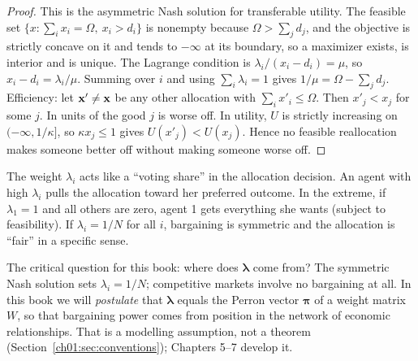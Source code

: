\documentclass[../structural_economics_book.tex]{subfiles}
\begin{document}
\begin{proof}
This is the asymmetric Nash solution \citep{kalai1977nonsymmetric} for transferable utility. The feasible set $\{x : \sum_i x_i = \Omega,\ x_i > d_i\}$ is nonempty because $\Omega > \sum_j d_j$, and the objective is strictly concave on it and tends to $-\infty$ at its boundary, so a maximizer exists, is interior and is unique. The Lagrange condition is $\lambda_i/(x_i - d_i) = \mu$, so $x_i - d_i = \lambda_i/\mu$. Summing over $i$ and using $\sum_i\lambda_i = 1$ gives $1/\mu = \Omega - \sum_j d_j$. Efficiency: let $\mathbf{x}' \neq \mathbf{x}$ be any other allocation with $\sum_i x'_i \le \Omega$. Then $x'_j < x_j$ for some $j$. In units of the good $j$ is worse off. In utility, $U$ is strictly increasing on $(-\infty, 1/\kappa]$, so $\kappa x_j \le 1$ gives $U(x'_j) < U(x_j)$. Hence no feasible reallocation makes someone better off without making someone worse off.
\end{proof}

\begin{intuition}
The weight $\lambda_i$ acts like a ``voting share'' in the allocation decision. An agent with high $\lambda_i$ pulls the allocation toward her preferred outcome. In the extreme, if $\lambda_1 = 1$ and all others are zero, agent 1 gets everything she wants (subject to feasibility). If $\lambda_i = 1/N$ for all $i$, bargaining is symmetric and the allocation is ``fair'' in a specific sense.

The critical question for this book: where does $\boldsymbol{\lambda}$ come from? The symmetric Nash solution sets $\lambda_i = 1/N$; competitive markets involve no bargaining at all. In this book we will \textit{postulate} that $\boldsymbol{\lambda}$ equals the Perron vector $\boldsymbol{\pi}$ of a weight matrix $W$, so that bargaining power comes from position in the network of economic relationships. That is a modelling assumption, not a theorem (Section~\ref{ch01:sec:conventions}); Chapters 5--7 develop it.
\end{intuition}
\end{document}
